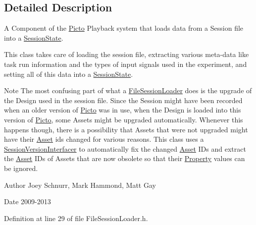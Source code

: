 \subsection{Detailed Description}
A Component of the \hyperlink{namespace_picto}{Picto} Playback system that loads data from a Session file into a \hyperlink{class_picto_1_1_session_state}{Session\-State}. 

This class takes care of loading the session file, extracting various meta-\/data like task run information and the types of input signals used in the experiment, and setting all of this data into a \hyperlink{class_picto_1_1_session_state}{Session\-State}.

\begin{DoxyNote}{Note}
The most confusing part of what a \hyperlink{class_picto_1_1_file_session_loader}{File\-Session\-Loader} does is the upgrade of the Design used in the session file. Since the Session might have been recorded when an older version of \hyperlink{namespace_picto}{Picto} was in use, when the Design is loaded into this version of \hyperlink{namespace_picto}{Picto}, some Assets might be upgraded automatically. Whenever this happens though, there is a possibility that Assets that were not upgraded might have their \hyperlink{class_picto_1_1_asset}{Asset} ids changed for various reasons. This class uses a \hyperlink{class_picto_1_1_session_version_interfacer}{Session\-Version\-Interfacer} to automatically fix the changed \hyperlink{class_picto_1_1_asset}{Asset} I\-Ds and extract the \hyperlink{class_picto_1_1_asset}{Asset} I\-Ds of Assets that are now obsolete so that their \hyperlink{class_picto_1_1_property}{Property} values can be ignored. 
\end{DoxyNote}
\begin{DoxyAuthor}{Author}
Joey Schnurr, Mark Hammond, Matt Gay 
\end{DoxyAuthor}
\begin{DoxyDate}{Date}
2009-\/2013 
\end{DoxyDate}


Definition at line 29 of file File\-Session\-Loader.\-h.



